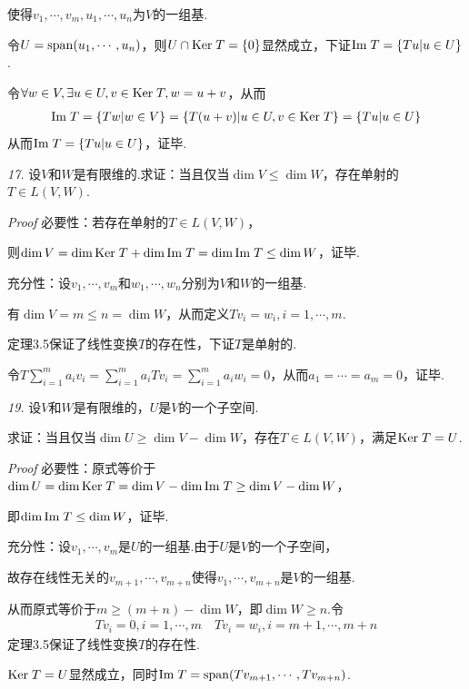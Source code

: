 使得\(v_1,\cdots,v_m,u_1,\cdots,u_n\)为\(V\)的一组基.

令\(U=\mathrm{span} (u_1,\cdots,u_n)\)，则\(U\cap \mathrm{Ker \;} T=\{0\}\)显然成立，下证\(\mathrm{Im \;} T=\{Tu|u\in U\}\).

令\(\forall w\in V,\exists u\in U,v\in \mathrm{Ker \;} T, w=u+v\)，从而
    \begin{align*}
        \mathrm{Im \;} T=\{Tw|w\in V\}=\{T(u+v)|u\in U,v\in \mathrm{Ker \;} T\}=\{Tu|u\in U\}
    \end{align*}
从而\(\mathrm{Im \;} T=\{Tu|u\in U\}\)，证毕.

\newpage

\textit{17.}
设\(V\)和\(W\)是有限维的.求证：当且仅当\(\dim V\leq \dim W\)，存在单射的\(T\in L(V,W)\).

\textit{Proof}
必要性：若存在单射的\(T\in L(V,W)\)，

则\(\dim V=\dim \mathrm{Ker \;} T+\dim \mathrm{Im \;} T=\dim \mathrm{Im \;} T \leq \dim W\)，证毕.

充分性：设\(v_1,\cdots,v_m\)和\(w_1,\cdots,w_n\)分别为\(V\)和\(W\)的一组基.

有\(\dim V=m\leq n=\dim W\)，从而定义\(Tv_i=w_i,i=1,\cdots,m\).

定理3.5保证了线性变换\(T\)的存在性，下证\(T\)是单射的.

令\(T\sum_{i=1}^m a_iv_i=\sum_{i=1}^m a_iTv_i=\sum_{i=1}^m a_iw_i=0\)，从而\(a_1=\cdots=a_m=0\)，证毕.

\hspace*{\fill}

\textit{19.}
设\(V\)和\(W\)是有限维的，\(U\)是\(V\)的一个子空间.

求证：当且仅当\(\dim U \geq \dim V-\dim W\)，存在\(T\in L(V,W)\)，满足\(\mathrm{Ker \;} T=U\).

\textit{Proof}
必要性：原式等价于\(\dim U=\dim \mathrm{Ker \;} T=\dim V-\dim \mathrm{Im \;} T \geq \dim V-\dim W\)，

即\(\dim \mathrm{Im \;} T \leq \dim W\)，证毕.

充分性：设\(v_1,\cdots,v_m\)是\(U\)的一组基.由于\(U\)是\(V\)的一个子空间，

故存在线性无关的\(v_{m+1},\cdots,v_{m+n}\)使得\(v_1,\cdots,v_{m+n}\)是\(V\)的一组基.

从而原式等价于\(m\geq (m+n)-\dim W\)，即\(\dim W\geq n\).令
    \begin{align*}
        Tv_i=0,i=1,\cdots,m \quad Tv_i=w_i,i=m+1,\cdots,m+n
    \end{align*}
定理3.5保证了线性变换\(T\)的存在性.

\(\mathrm{Ker \;} T=U\)显然成立，同时\(\mathrm{Im \;} T=\mathrm{span} (Tv_{m+1},\cdots,Tv_{m+n})\).

